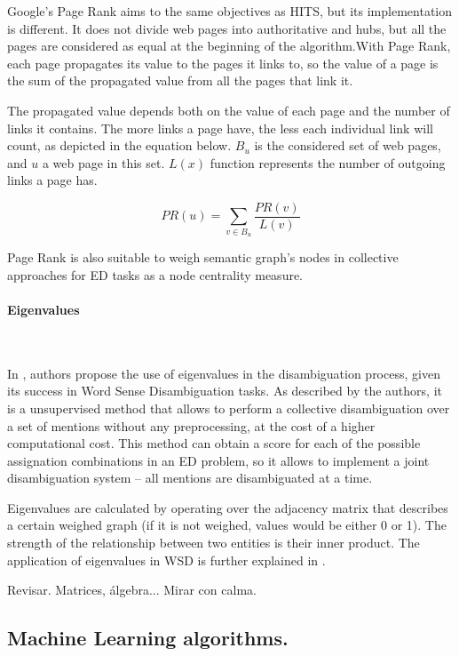 Google's Page Rank aims to the same objectives as HITS, but its implementation is different. It does not divide web pages into authoritative and hubs, but all the pages are considered as equal at the beginning of the algorithm.With Page Rank, each page propagates its value to the pages it links to, so the value of a page is the sum of the propagated value from all the pages that link it.

The propagated value depends both on the value of each page and the number of links it contains. The more links a page have, the less each individual link will count, as depicted in the equation below. $B_u$ is the considered set of web pages, and $u$ a web page in this set. $L(x)$ function represents the number of outgoing links a page has.

\begin{equation}
PR(u)= \sum _{v \in B_u} \frac{PR(v)}{L(v)}
\label{eq:pagerank}
\end{equation}

Page Rank is also suitable to weigh semantic graph's nodes in collective approaches for ED tasks as a node centrality measure.


\paragraph{Eigenvalues}~

In \cite{hulpus2013}, authors propose the use of eigenvalues in the disambiguation process, given its success in Word Sense Disambiguation tasks. As described by the authors, it is a unsupervised method that allows to perform a collective disambiguation over a set of mentions without any preprocessing, at the cost of a higher computational cost. This method can obtain a score for each of the possible assignation combinations in an ED problem, so it allows to implement a joint disambiguation system -- all mentions are disambiguated at a time.

Eigenvalues are calculated by operating over the adjacency matrix that describes a certain weighed graph (if it is not weighed, values would be either 0 or 1). The strength of the relationship between two entities is their inner product. The application of eigenvalues in WSD is further explained in \cite{hulpus2012}.

{\color{red} Revisar. Matrices, álgebra... Mirar con calma.}




\subsection{Machine Learning algorithms.}
\label{sec:techniques:ml}

